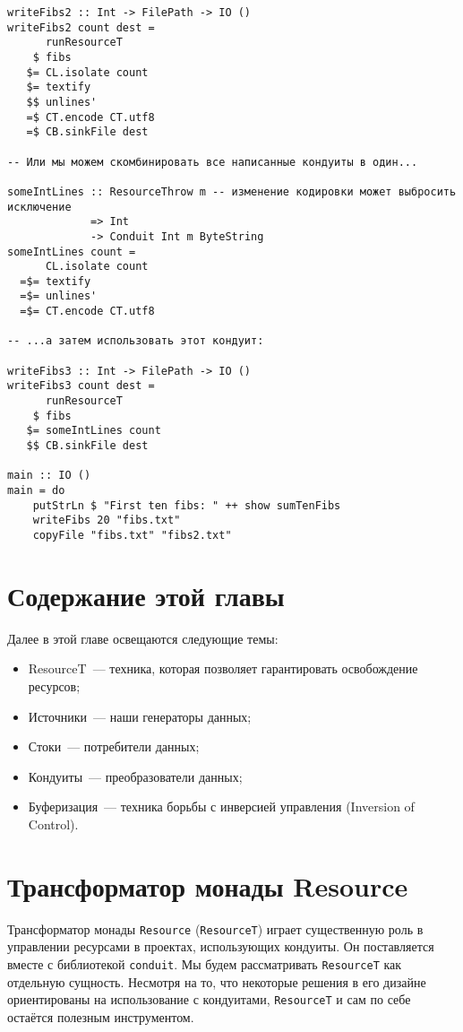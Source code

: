 \begin{lstlisting}
writeFibs2 :: Int -> FilePath -> IO ()
writeFibs2 count dest =
      runResourceT
    $ fibs
   $= CL.isolate count
   $= textify
   $$ unlines'
   =$ CT.encode CT.utf8
   =$ CB.sinkFile dest

-- Или мы можем скомбинировать все написанные кондуиты в один...

someIntLines :: ResourceThrow m -- изменение кодировки может выбросить исключение
             => Int
             -> Conduit Int m ByteString
someIntLines count =
      CL.isolate count
  =$= textify
  =$= unlines'
  =$= CT.encode CT.utf8

-- ...а затем использовать этот кондуит:

writeFibs3 :: Int -> FilePath -> IO ()
writeFibs3 count dest =
      runResourceT
    $ fibs
   $= someIntLines count
   $$ CB.sinkFile dest

main :: IO ()
main = do
    putStrLn $ "First ten fibs: " ++ show sumTenFibs
    writeFibs 20 "fibs.txt"
    copyFile "fibs.txt" "fibs2.txt"
\end{lstlisting}

\section{Содержание этой главы}

Далее в этой главе освещаются следующие темы:
\begin{itemize}
 \item ResourceT~--- техника, которая позволяет гарантировать освобождение ресурсов;
 \item Источники~--- наши генераторы данных;
 \item Стоки~--- потребители данных;
 \item Кондуиты~--- преобразователи данных;
 \item Буферизация~--- техника борьбы с инверсией управления (Inversion of Control).
\end{itemize}

\section{Трансформатор монады Resource}

Трансформатор монады \lstinline!Resource! (\lstinline!ResourceT!) играет существенную роль в управлении ресурсами в
проектах, использующих кондуиты. Он поставляется вместе с библиотекой \verb=conduit=.
Мы будем рассматривать \lstinline!ResourceT! как отдельную сущность. Несмотря на то, что некоторые решения в его дизайне ориентированы на использование с кондуитами, \lstinline!ResourceT! и сам по себе остаётся полезным инструментом.

